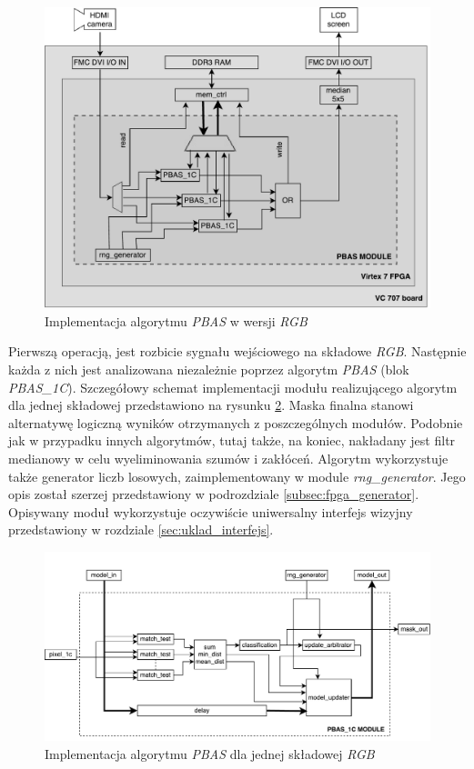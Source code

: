 	\begin{figure}[h!]
		\centering
		\includegraphics[scale=0.6]{img/4/pbas.pdf}
		\caption{Implementacja algorytmu \textit{PBAS} w wersji \textit{RGB}}
		\label{fig:pbas_diagram}
	\end{figure}

Pierwszą operacją, jest rozbicie sygnału wejściowego na składowe \textit{RGB}. 
Następnie każda z nich jest analizowana niezależnie poprzez algorytm \textit{PBAS} (blok \textit{PBAS\_1C}). 
Szczegółowy schemat implementacji modułu realizującego algorytm dla jednej składowej przedstawiono na rysunku \ref{fig:pbas_1c_diagram}. 
Maska finalna stanowi alternatywę logiczną wyników otrzymanych z poszczególnych modułów. 
Podobnie jak w przypadku innych algorytmów, tutaj także, na koniec, nakładany jest filtr medianowy w celu wyeliminowania szumów i zakłóceń.
Algorytm wykorzystuje także generator liczb losowych, zaimplementowany w module \textit{rng\_generator}. 
Jego opis został szerzej przedstawiony w podrozdziale \ref{subsec:fpga_generator}. 
Opisywany moduł wykorzystuje oczywiście uniwersalny interfejs wizyjny przedstawiony w rozdziale \ref{sec:uklad_interfejs}. 
	
	\begin{figure}[h!]
		\centering
		\includegraphics[scale=0.55]{img/4/pbas_1c.pdf}
		\caption{Implementacja algorytmu \textit{PBAS} dla jednej składowej \textit{RGB}}
		\label{fig:pbas_1c_diagram}
	\end{figure}	
	
